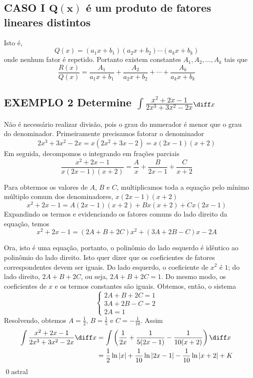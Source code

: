\documentclass[a4paper, 12pt]{extreport}
\begin{document}
    \vspace{10mm}
    \subsection*{\small CASO I $\mathbf{Q(x)}$ é um produto de fatores lineares distintos}
      \flushleft Isto é, $$ Q(x) = (a_1x + b_1)(a_2x + b_2)\cdots(a_kx + b_k) $$ onde nenhum fator é repetido. Portanto existem constantes
      $A_1, A_2,..., A_k$ tais que
      \begin{equation}
        \frac{R(x)}{Q(x)} = \frac{A_1}{a_1x+b_1} + \frac{A_2}{a_2x+b_2} + \cdots + \frac{A_k}{a_kx+b_k}
      \end{equation}

      \subsection*{\small {\color{astral}EXEMPLO 2} \textmd{Determine \large$\int{\frac{x^2+2x-1}{2x^3+3x^2-2x}}$\normalsize$\diff x$}}
        \justifying Não é necessário realizar divisão, pois o grau do numerador é menor que o grau do denominador. Primeiramente precisamos fatorar o denominador
        $$ 2x^3+3x^2-2x = x(2x^2+3x-2) = x(2x-1)(x+2) $$
        Em seguida, decompomos o integrando em frações parciais
        $$ \frac{x^2+2x-1}{x(2x-1)(x+2)} = \frac{A}{x} + \frac{B}{2x-1} + \frac{C}{x+2} $$

        Para obtermos os valores de $A$, $B$ e $C$, multiplicamos toda a equação pelo mínimo múltiplo comum dos denominadores, $x(2x-1)(x+2)$
        $$ x^2+2x-1 = A(2x-1)(x+2) + Bx(x+2) + Cx(2x-1) $$
        Expandindo os termos e evidenciando os fatores comuns do lado direito da equação, temos
        $$ x^2+2x-1 = (2A+B+2C)x^2 + (3A+2B-C)x - 2A $$

        Ora, isto é uma equação, portanto, o polinômio do lado esquerdo é idêntico ao polinômio do lado direito. Isto quer dizer que os coeficientes
        de fatores correspondentes devem ser iguais. Do lado esquerdo, o coeficiente de $x^2$ é $1$; do lado direito, $2A+B+2C$, ou seja, $2A+B+2C = 1$.
        Do mesmo modo, os coeficientes de $x$ e os termos constantes são iguais. Obtemos, então, o sistema
        \begin{equation*}
          \begin{cases}
            2A+B+2C = 1 \\
            3A+2B-C = 2 \\
            2A = 1
          \end{cases}
        \end{equation*}
        Resolvendo, obtemos $A = \frac{1}{2}$, $B = \frac{1}{5}$ e $C = -\frac{1}{10}$. Assim
        \begin{equation*}
          \begin{split}
            \int{\frac{x^2+2x-1}{2x^3+3x^2-2x}\diff x} & = \int{\left(\frac{1}{2x} + \frac{1}{5(2x-1)} - \frac{1}{10(x+2)}\right)\diff x} \\
                                                  & = \frac{1}{2}\ln|x| + \frac{1}{10}\ln|2x-1| - \frac{1}{10}\ln|x+2| + K
          \end{split}
        \end{equation*}
        \qed{astral}
\end{document}
